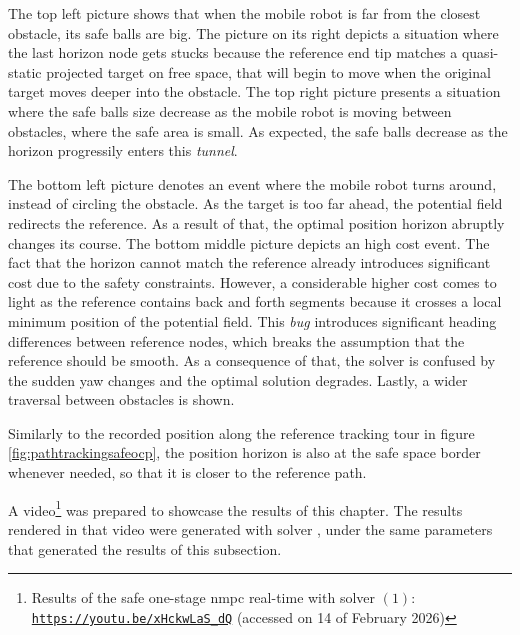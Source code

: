 The top left picture shows that when the mobile robot is far from the closest obstacle, its safe balls are big. The picture on its right depicts a situation where the last horizon node gets stucks because the reference end tip matches a quasi-static projected target on free space, that will begin to move when the original target moves deeper into the obstacle. The top right picture presents a situation where the safe balls size decrease as the mobile robot is moving between obstacles, where the safe area is small. As expected, the safe balls decrease as the horizon progressily enters this \textit{tunnel}.

The bottom left picture denotes an event where the mobile robot turns around, instead of circling the obstacle. As the target is too far ahead, the potential field redirects the reference. As a result of that, the optimal position horizon abruptly changes its course. The bottom middle picture depicts an high cost event. The fact that the horizon cannot match the reference already introduces significant cost due to the safety constraints. However, a considerable higher cost comes to light as the reference contains back and forth segments because it crosses a local minimum position of the potential field. This \textit{bug} introduces significant heading differences between reference nodes, which breaks the assumption that the reference should be smooth. As a consequence of that, the solver is confused by the sudden yaw changes and the optimal solution degrades. Lastly, a wider traversal between obstacles is shown.

Similarly to the recorded position along the reference tracking tour in figure \ref{fig:pathtrackingsafeocp}, the position horizon is also at the safe space border whenever needed, so that it is closer to the reference path.

A video\footnote{Results of the safe one-stage \acrshort{nmpc} real-time with solver $(1)$: \texttt{\url{https://youtu.be/xHckwLaS_dQ}} (accessed on 14 of February 2026)} was prepared to showcase the results of this chapter. The results rendered in that video were generated with solver , under the same parameters that generated the results of this subsection.

%
%
%

